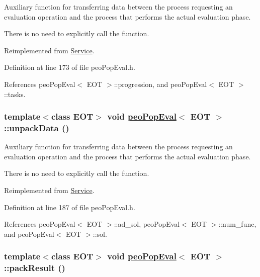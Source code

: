 Auxiliary function for transferring data between the process requesting an evaluation operation and the process that performs the actual evaluation phase. 

There is no need to explicitly call the function. 

Reimplemented from \hyperlink{classService_aea4b8f7f8fb88e83862ee4bfd9ab207}{Service}.

Definition at line 173 of file peo\-Pop\-Eval.h.

References peo\-Pop\-Eval$<$ EOT $>$::progression, and peo\-Pop\-Eval$<$ EOT $>$::tasks.\hypertarget{classpeoPopEval_cb256d94000a47af06d3e8a3f7ab0eff}{
\subsubsection[unpackData]{\setlength{\rightskip}{0pt plus 5cm}template$<$class EOT$>$ void \hyperlink{classpeoPopEval}{peo\-Pop\-Eval}$<$ EOT $>$::unpack\-Data ()}}
\label{classpeoPopEval_cb256d94000a47af06d3e8a3f7ab0eff}


Auxiliary function for transferring data between the process requesting an evaluation operation and the process that performs the actual evaluation phase. 

There is no need to explicitly call the function. 

Reimplemented from \hyperlink{classService_3bd87b444710813d30fd754d4d0b4df3}{Service}.

Definition at line 187 of file peo\-Pop\-Eval.h.

References peo\-Pop\-Eval$<$ EOT $>$::ad\_\-sol, peo\-Pop\-Eval$<$ EOT $>$::num\_\-func, and peo\-Pop\-Eval$<$ EOT $>$::sol.\hypertarget{classpeoPopEval_9d0d10865d677c1ec84f496bed62a8c6}{
\subsubsection[packResult]{\setlength{\rightskip}{0pt plus 5cm}template$<$class EOT$>$ void \hyperlink{classpeoPopEval}{peo\-Pop\-Eval}$<$ EOT $>$::pack\-Result ()}}
\label{classpeoPopEval_9d0d10865d677c1ec84f496bed62a8c6}


